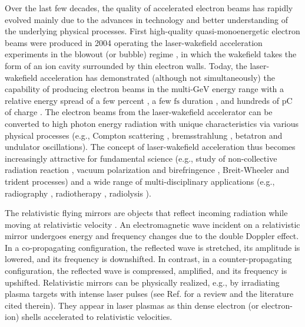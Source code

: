 \documentclass[10pt, a4paper, twoside, openright]{report}
\begin{document}
Over the last few decades, the quality of accelerated electron beams has rapidly evolved mainly due to the advances in technology and better understanding of the underlying physical processes. First high-quality quasi-monoenergetic electron beams were produced in 2004 \cite{Faure2004, Geddes2004, Mangles2004} operating the laser-wakefield acceleration experiments in the blowout (or bubble) regime \cite{Pukhov2002, Lu2006, Lu2007}, in which the wakefield takes the form of an ion cavity surrounded by thin electron walls. Today, the laser-wakefield acceleration has demonstrated (although not simultaneously) the capability of producing electron beams in the multi-$ \mathrm{GeV} $ energy range with a relative energy spread of a few percent \cite{Kim2013, Leemans2014, Gonsalves2019}, a few $ \mathrm{fs} $ duration \cite{Tilborg2006, Ohkubo2007, Debus2010, Lundh2011}, and hundreds of $ \mathrm{pC} $ of charge \cite{Couperus2017}. The electron beams from the laser-wakefield accelerator can be converted to high photon energy radiation with unique characteristics via various physical processes (e.g., Compton scattering \cite{Compton1923}, bremsstrahlung \cite{Bernstein1970}, betatron \cite{Whittum1990} and undulator \cite{Schwinger1949} oscillations). The concept of laser-wakefield acceleration thus becomes increasingly attractive for fundamental science (e.g., study of non-collective radiation reaction \cite{Zeldovich1975}, vacuum polarization and birefringence \cite{Dirac1934}, Breit-Wheeler \cite{Breit1934} and trident \cite{Ritus1972} processes) and a wide range of multi-disciplinary applications (e.g., radiography \cite{Glinec2005}, radiotherapy \cite{Malka2010, DesRosiers2000}, radiolysis \cite{Malka2010, Gauduel2010}).

The relativistic flying mirrors are objects that reflect incoming radiation while moving at relativistic velocity \cite{Einstein1905}. An electromagnetic wave incident on a relativistic mirror undergoes energy and frequency changes due to the double Doppler effect. In a co-propagating configuration, the reflected wave is stretched, its amplitude is lowered, and its frequency is downshifted. In contrast, in a counter-propagating configuration, the reflected wave is compressed, amplified, and its frequency is upshifted. Relativistic mirrors can be physically realized, e.g., by irradiating plasma targets with intense laser pulses (see Ref.  for a review and the literature cited therein). They appear in laser plasmas as thin dense electron (or electron-ion) shells accelerated to relativistic velocities. 
\end{document}
